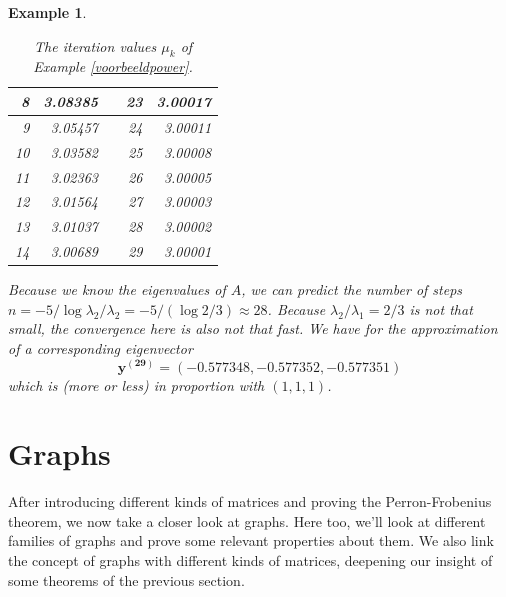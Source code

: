 \documentclass[a4paper,11pt]{report}
\newtheorem{example}[theorem]{Example}
\begin{document}
\begin{example}
\begin{table}[h!]
\begin{tabular}{|r|r|r|r|r|}
8                         & 3.08385                      &                       & 23                       & 3.00017                      \\ \hline
9                         & 3.05457                      &                       & 24                       & 3.00011                      \\ \hline
10                        & 3.03582                      &                       & 25                       & 3.00008                      \\ \hline
11                        & 3.02363                      &                       & 26                       & 3.00005                      \\ \hline
12                        & 3.01564                      &                       & 27                       & 3.00003                      \\ \hline
13                        & 3.01037                      &                       & 28                       & 3.00002                      \\ \hline
14                        & 3.00689                      &                       & 29                       & 3.00001                      \\ \hline
\end{tabular}
\caption{The iteration values $\mu_k$ of  Example \ref{voorbeeldpower}.} 
\end{table}\label{tablepower}
Because we know the eigenvalues of $A$, we can predict the number of steps 
$n = -5/\log{\lambda_2/\lambda_2} = -5/(\log{2/3}) \approx 28$. Because $\lambda_2/\lambda_1 = 2/3$ 
is not that small, the convergence here is also not that fast.  We have for the 
approximation of a corresponding eigenvector $$\mathbf{y^{(29)}} = (-0.577348, -0.577352, -0.577351)$$ 
which is (more or less) in proportion with $(1,1,1)$.

\end{example}



\section{Graphs}
After introducing different kinds of matrices and proving the Perron-Frobenius 
theorem, we now take a closer look at graphs. Here too, we'll look at different 
families of graphs and prove some relevant properties about them. We also link 
the concept of graphs with different kinds of matrices, deepening our 
insight of some theorems of the previous section.\\
\end{document}
